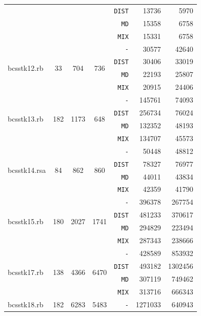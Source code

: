 \documentclass{ctuthesis}
\theoremstyle{plain}
\theoremstyle{definition}
\begin{document}
{\begin{longtable}{|l|c|c|c|r|r|r|}
    & & & &\texttt{DIST} &	13736	&	5970	\\
    & & & &\texttt{MD}   &	15358	&	6758	\\
    & & & &\texttt{MIX}  &	15331	&	6758	\\
    \hline
  \multirow{4}{*}{bcsstk12.rb	}
    &	\multirow{4}{*}{33}	&	\multirow{4}{*}{704}	&	\multirow{4}{*}{736}	&\texttt{-}    &	30577	&	42640	\\
    & & & &\texttt{DIST} &	30406	&	33019	\\
    & & & &\texttt{MD}   &	22193	&	25807	\\
    & & & &\texttt{MIX}  &	20915	&	24406	\\
    \hline
  \multirow{4}{*}{bcsstk13.rb	}
    &	\multirow{4}{*}{182}	&	\multirow{4}{*}{1173}	&	\multirow{4}{*}{648}	&\texttt{-}    &	145761	&	74093	\\
    & & & &\texttt{DIST} &	256734	&	76024	\\
    & & & &\texttt{MD}   &	132352	&	48193	\\
    & & & &\texttt{MIX}  &	134707	&	45573	\\
    \hline
  \multirow{4}{*}{bcsstk14.rsa	}
    &	\multirow{4}{*}{84}	&	\multirow{4}{*}{862}	&	\multirow{4}{*}{860}	&\texttt{-}    &	50448	&	48812	\\
    & & & &\texttt{DIST} &	78327	&	76977	\\
    & & & &\texttt{MD}   &	44011	&	43834	\\
    & & & &\texttt{MIX}  &	42359	&	41790	\\
    \hline
  \multirow{4}{*}{bcsstk15.rb	}
    &	\multirow{4}{*}{180}	&	\multirow{4}{*}{2027}	&	\multirow{4}{*}{1741}	&\texttt{-}    &	396378	&	267754	\\
    & & & &\texttt{DIST} &	481233	&	370617	\\
    & & & &\texttt{MD}   &	294829	&	223494	\\
    & & & &\texttt{MIX}  &	287343	&	238666	\\
    \hline
  \multirow{4}{*}{bcsstk17.rb	}
    &	\multirow{4}{*}{138}	&	\multirow{4}{*}{4366}	&	\multirow{4}{*}{6470}	&\texttt{-}    &	428589	&	853932	\\
    & & & &\texttt{DIST} &	493182	&	1302456	\\
    & & & &\texttt{MD}   &	307119	&	749462	\\
    & & & &\texttt{MIX}  &	313716	&	666343	\\
    \hline
  \multirow{4}{*}{bcsstk18.rb	}
    &	\multirow{4}{*}{182}	&	\multirow{4}{*}{6283}	&	\multirow{4}{*}{5483}	&\texttt{-}    &	1271033	&	640943	\\

\end{longtable}}
\end{document}
